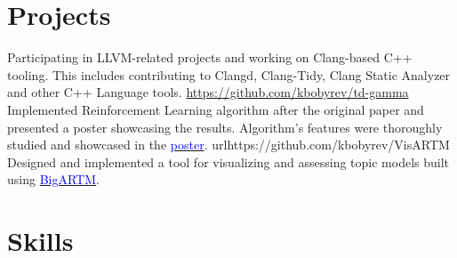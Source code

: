 \documentclass[10pt,a4paper,sans]{moderncv}
\begin{document}

\section{Projects}
    {Participating in LLVM-related projects and working on Clang-based C++
     tooling. This includes contributing to Clangd, Clang-Tidy, Clang Static
     Analyzer and other C++ Language tools.}
    {\url{https://github.com/kbobyrev/td-gamma}}{}
    {Implemented Reinforcement Learning algorithm after the original paper and
     presented a poster showcasing the results. Algorithm's features were
     thoroughly studied and showcased in the
     \href{https://kbobyrev.github.io/resources/TD-Gamma-Poster.pdf}{\textcolor{blue}{poster}}.}
    {url{https://github.com/kbobyrev/VisARTM}}{}
    {Designed and implemented a tool for visualizing and assessing topic models
     built using
     \href{https://github.com/bigartm/bigartm}{\textcolor{blue}{BigARTM}}.}

\section{Skills}

\nocite{*}


\end{document}

